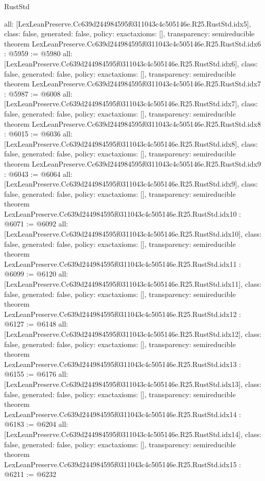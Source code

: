 \begin{lexlean}{RustStd}
\begin{coremodule}
{  all: [LexLeanPreserve.Cc639d244984595f0311043c4c505146e.R25.RustStd.idx5],
  class: false,
  generated: false,
  policy: exact{axioms: []},
  transparency: semireducible
}
theorem LexLeanPreserve.Cc639d244984595f0311043c4c505146e.R25.RustStd.idx6 : @5959 := @5980 {
  all: [LexLeanPreserve.Cc639d244984595f0311043c4c505146e.R25.RustStd.idx6],
  class: false,
  generated: false,
  policy: exact{axioms: []},
  transparency: semireducible
}
theorem LexLeanPreserve.Cc639d244984595f0311043c4c505146e.R25.RustStd.idx7 : @5987 := @6008 {
  all: [LexLeanPreserve.Cc639d244984595f0311043c4c505146e.R25.RustStd.idx7],
  class: false,
  generated: false,
  policy: exact{axioms: []},
  transparency: semireducible
}
theorem LexLeanPreserve.Cc639d244984595f0311043c4c505146e.R25.RustStd.idx8 : @6015 := @6036 {
  all: [LexLeanPreserve.Cc639d244984595f0311043c4c505146e.R25.RustStd.idx8],
  class: false,
  generated: false,
  policy: exact{axioms: []},
  transparency: semireducible
}
theorem LexLeanPreserve.Cc639d244984595f0311043c4c505146e.R25.RustStd.idx9 : @6043 := @6064 {
  all: [LexLeanPreserve.Cc639d244984595f0311043c4c505146e.R25.RustStd.idx9],
  class: false,
  generated: false,
  policy: exact{axioms: []},
  transparency: semireducible
}
theorem LexLeanPreserve.Cc639d244984595f0311043c4c505146e.R25.RustStd.idx10 : @6071 := @6092 {
  all: [LexLeanPreserve.Cc639d244984595f0311043c4c505146e.R25.RustStd.idx10],
  class: false,
  generated: false,
  policy: exact{axioms: []},
  transparency: semireducible
}
theorem LexLeanPreserve.Cc639d244984595f0311043c4c505146e.R25.RustStd.idx11 : @6099 := @6120 {
  all: [LexLeanPreserve.Cc639d244984595f0311043c4c505146e.R25.RustStd.idx11],
  class: false,
  generated: false,
  policy: exact{axioms: []},
  transparency: semireducible
}
theorem LexLeanPreserve.Cc639d244984595f0311043c4c505146e.R25.RustStd.idx12 : @6127 := @6148 {
  all: [LexLeanPreserve.Cc639d244984595f0311043c4c505146e.R25.RustStd.idx12],
  class: false,
  generated: false,
  policy: exact{axioms: []},
  transparency: semireducible
}
theorem LexLeanPreserve.Cc639d244984595f0311043c4c505146e.R25.RustStd.idx13 : @6155 := @6176 {
  all: [LexLeanPreserve.Cc639d244984595f0311043c4c505146e.R25.RustStd.idx13],
  class: false,
  generated: false,
  policy: exact{axioms: []},
  transparency: semireducible
}
theorem LexLeanPreserve.Cc639d244984595f0311043c4c505146e.R25.RustStd.idx14 : @6183 := @6204 {
  all: [LexLeanPreserve.Cc639d244984595f0311043c4c505146e.R25.RustStd.idx14],
  class: false,
  generated: false,
  policy: exact{axioms: []},
  transparency: semireducible
}
theorem LexLeanPreserve.Cc639d244984595f0311043c4c505146e.R25.RustStd.idx15 : @6211 := @6232 {
}
\end{coremodule}
\end{lexlean}
